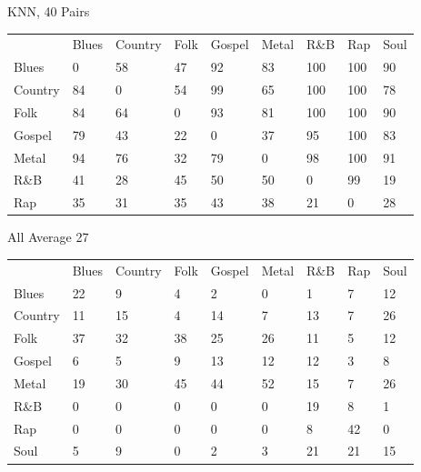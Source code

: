 \documentclass[a4paper,oneside]{article}
\begin{document}
KNN, 40
Pairs
\begin{table}
\begin{tabular}{|l||*{8}{l|}} \hline
 & Blues & Country & Folk & Gospel & Metal & R\&B & Rap & Soul \\ \hhline{|=||*{8}{=|}}
Blues & 0 & 58 & 47 & 92 & 83 & 100 & 100 & 90 \\ \hline
Country & 84 & 0 & 54 & 99 & 65 & 100 & 100 & 78 \\ \hline
Folk & 84 & 64 & 0 & 93 & 81 & 100 & 100 & 90 \\ \hline
Gospel & 79 & 43 & 22 & 0 & 37 & 95 & 100 & 83 \\ \hline
Metal & 94 & 76 & 32 & 79 & 0 & 98 & 100 & 91 \\ \hline
R\&B & 41 & 28 & 45 & 50 & 50 & 0 & 99 & 19 \\ \hline
Rap & 35 & 31 & 35 & 43 & 38 & 21 & 0 & 28 \\ \hline
\end{tabular}
\end{table}

All
Average 27
\begin{table}
\begin{tabular}{|l||*{8}{l|}} \hline
 & Blues & Country & Folk & Gospel & Metal & R\&B & Rap & Soul \\ \hhline{|=||*{8}{=|}}
Blues & 22 & 9 & 4 & 2 & 0 & 1 & 7 & 12 \\ \hline
Country & 11 & 15 & 4 & 14 & 7 & 13 & 7 & 26 \\ \hline
Folk & 37 & 32 & 38 & 25 & 26 & 11 & 5 & 12 \\ \hline
Gospel & 6 & 5 & 9 & 13 & 12 & 12 & 3 & 8 \\ \hline
Metal & 19 & 30 & 45 & 44 & 52 & 15 & 7 & 26 \\ \hline
R\&B & 0 & 0 & 0 & 0 & 0 & 19 & 8 & 1 \\ \hline
Rap & 0 & 0 & 0 & 0 & 0 & 8 & 42 & 0 \\ \hline
Soul & 5 & 9 & 0 & 2 & 3 & 21 & 21 & 15 \\ \hline
\end{tabular}
\end{table}
\end{document}
